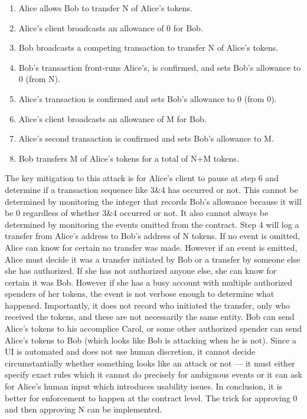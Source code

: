 \begin{enumerate}
	\item Alice allows Bob to transfer N of Alice's tokens.
	\item Alice's client broadcasts an allowance of 0 for Bob.
	\item Bob broadcasts a competing transaction to transfer N of Alice’s tokens.
	\item Bob's transaction front-runs Alice's, is confirmed, and sets Bob’s allowance to 0 (from N).
	\item Alice’s transaction is confirmed and sets Bob’s allowance to 0 (from 0).
	\item Alice's client broadcasts an allowance of M for Bob.
	\item Alice’s second transaction is confirmed and sets Bob's allowance to M.
	\item Bob transfers M of Alice’s tokens for a total of N+M tokens.
\end{enumerate}

The key mitigation to this attack is for Alice's client to pause at step 6 and determine if a transaction sequence like 3\&4 has occurred or not. This cannot be determined by monitoring the integer that records Bob's allowance because it will be 0 regardless of whether 3\&4 occurred or not. It also cannot always be determined by monitoring the events omitted from the contract. Step 4 will log a transfer from Alice's address to Bob's address of N tokens. If no event is omitted, Alice can know for certain no transfer was made. However if an event is emitted, Alice must decide it was a transfer initiated by Bob or a transfer by someone else she has authorized. If she has not authorized anyone else, she can know for certain it was Bob. However if she has a busy account with multiple authorized spenders of her tokens, the event is not verbose enough to determine what happened. Importantly, it does not record who initiated the transfer, only who received the tokens, and these are not necessarily the same entity. Bob can send Alice's tokens to his accomplice Carol, or some other authorized spender can send Alice's tokens to Bob (which looks like Bob is attacking when he is not). Since a UI is automated and does not use human discretion, it cannot decide circumstantially whether something looks like an attack or not --- it must either specify exact rules which it cannot do precisely for ambiguous events or it can ask for Alice's human input which introduces usability issues. In conclusion, it is better for enforcement to happen at the contract level. The trick for approving 0 and then approving N can be implemented. 

